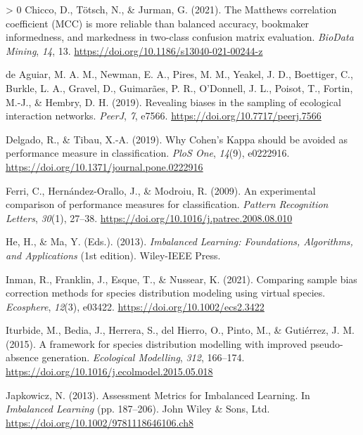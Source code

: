 \documentclass[11pt]{article}
\newlength{\cslhangindent}
\newenvironment{CSLReferences}[3] %
 {%
  \setlength{\parindent}{0pt}
  \ifodd #1 \everypar{\setlength{\hangindent}{\cslhangindent}}\ignorespaces\fi
  \ifnum #2 > 0
  \setlength{\parskip}{#2\baselineskip}
  \fi
 }%
 {}
\begin{document}
\begin{CSLReferences}{1}{0}
\leavevmode\hypertarget{ref-Chicco2021MatCor}{}%
Chicco, D., Tötsch, N., \& Jurman, G. (2021). The Matthews correlation
coefficient (MCC) is more reliable than balanced accuracy, bookmaker
informedness, and markedness in two-class confusion matrix evaluation.
\emph{BioData Mining}, \emph{14}, 13.
\url{https://doi.org/10.1186/s13040-021-00244-z}

\leavevmode\hypertarget{ref-deAguiar2019RevBia}{}%
de Aguiar, M. A. M., Newman, E. A., Pires, M. M., Yeakel, J. D.,
Boettiger, C., Burkle, L. A., Gravel, D., Guimarães, P. R., O'Donnell,
J. L., Poisot, T., Fortin, M.-J., \& Hembry, D. H. (2019). Revealing
biases in the sampling of ecological interaction networks. \emph{PeerJ},
\emph{7}, e7566. \url{https://doi.org/10.7717/peerj.7566}

\leavevmode\hypertarget{ref-Delgado2019WhyCoh}{}%
Delgado, R., \& Tibau, X.-A. (2019). Why Cohen's Kappa should be avoided
as performance measure in classification. \emph{PloS One}, \emph{14}(9),
e0222916. \url{https://doi.org/10.1371/journal.pone.0222916}

\leavevmode\hypertarget{ref-Ferri2009ExpCom}{}%
Ferri, C., Hernández-Orallo, J., \& Modroiu, R. (2009). An experimental
comparison of performance measures for classification. \emph{Pattern
Recognition Letters}, \emph{30}(1), 27--38.
\url{https://doi.org/10.1016/j.patrec.2008.08.010}

\leavevmode\hypertarget{ref-He2013ImbLea}{}%
He, H., \& Ma, Y. (Eds.). (2013). \emph{Imbalanced Learning:
Foundations, Algorithms, and Applications} (1st edition). Wiley-IEEE
Press.

\leavevmode\hypertarget{ref-Inman2021ComSam}{}%
Inman, R., Franklin, J., Esque, T., \& Nussear, K. (2021). Comparing
sample bias correction methods for species distribution modeling using
virtual species. \emph{Ecosphere}, \emph{12}(3), e03422.
\url{https://doi.org/10.1002/ecs2.3422}

\leavevmode\hypertarget{ref-Iturbide2015FraSpe}{}%
Iturbide, M., Bedia, J., Herrera, S., del Hierro, O., Pinto, M., \&
Gutiérrez, J. M. (2015). A framework for species distribution modelling
with improved pseudo-absence generation. \emph{Ecological Modelling},
\emph{312}, 166--174.
\url{https://doi.org/10.1016/j.ecolmodel.2015.05.018}

\leavevmode\hypertarget{ref-Japkowicz2013AssMet}{}%
Japkowicz, N. (2013). Assessment Metrics for Imbalanced Learning. In
\emph{Imbalanced Learning} (pp. 187--206). John Wiley \& Sons, Ltd.
\url{https://doi.org/10.1002/9781118646106.ch8}


\end{CSLReferences}
\end{document}
